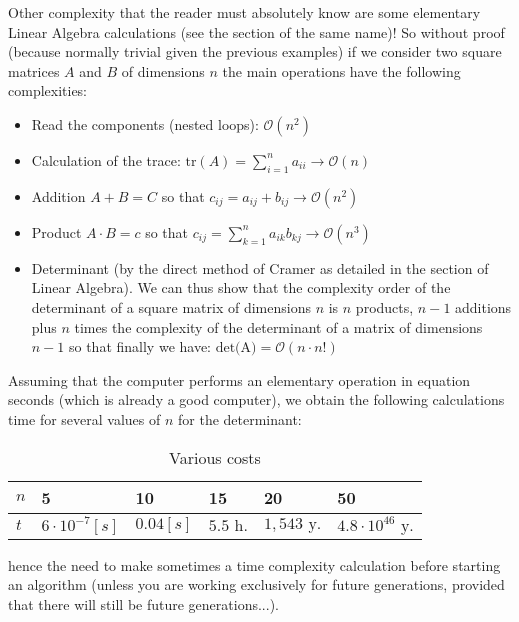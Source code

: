 Other complexity that the reader must absolutely know are some elementary Linear Algebra calculations (see the section of the same name)! So without proof (because normally trivial given the previous examples) if we consider two square matrices $A$ and $B$ of dimensions $n$ the main operations have the following complexities:
	\begin{itemize}
		\item Read the components (nested loops): $\mathcal{O}(n^2)$
		\item Calculation of the trace: $\text{tr}(A)=\displaystyle\sum_{i=1}^{n}a_{ii}\rightarrow \mathcal{O}(n)$ 
		\item Addition $A+B=C$ so that $c_{ij}=a_{ij}+b_{ij}\rightarrow \mathcal{O}(n^2)$
		\item Product $A\cdot B=c$ so that $c_{ij}=\displaystyle\sum_{k=1}^na_{ik}b_{kj}\rightarrow \mathcal{O}(n^3)$
		\item Determinant (by the direct method of Cramer as detailed in the section of Linear Algebra). We can thus show that the complexity order of the determinant of a square matrix of dimensions $n$ is $n$ products, $n-1$ additions plus $n$ times the complexity of the determinant of a matrix of dimensions $n-1$ so that finally we have: $\text{det(A)}=\mathcal{O}(n\cdot n!)$
	\end{itemize}
Assuming that the computer performs an elementary operation in equation seconds (which is already a good computer), we obtain the following calculations time for several values of $n$ for the determinant:

	\begin{table}[H]
	\begin{center}
			\begin{tabular}{|p{1cm}|p{2cm}|p{2cm}|p{2cm}|p{2cm}|p{2cm}|}
				\hline
				{\cellcolor{black!30}$n$} & 5 &  10 & 15 & 20 & 50\\ \hline
				 {\cellcolor{black!30}}$t$ & $6\cdot 10^{-7}[s]$ & $0.04[s]$ & $5.5 \text{ h.}$ & $1,543 \text{ y.}$ & $4.8\cdot 10^{46} \text{ y.}$ \\ \hline
		\end{tabular}
	\end{center}
	\caption[]{Various costs}
	\end{table}	
	hence the need to make sometimes a time complexity calculation before starting an algorithm (unless you are working exclusively for future generations, provided that there will still be future generations...).

